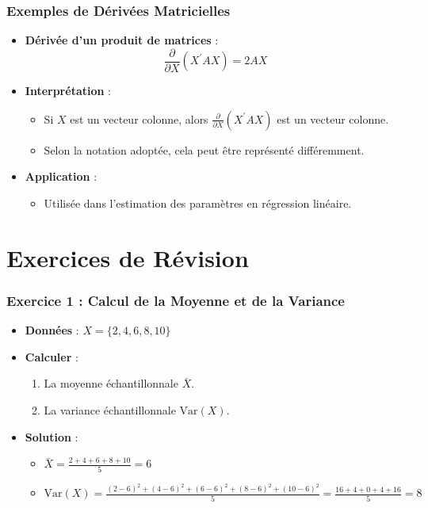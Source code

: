\documentclass{beamer}
\begin{document}
\begin{frame}
  \frametitle{Exemples de Dérivées Matricielles}
  \begin{itemize}
    \item \textbf{Dérivée d’un produit de matrices} : 
    \[
    \frac{\partial}{\partial X} (X^{\prime} A X) = 2 A X
    \]
    \item \textbf{Interprétation} :
      \begin{itemize}
        \item Si \(X\) est un vecteur colonne, alors \(\frac{\partial}{\partial X} (X^{\prime} A X)\) est un vecteur colonne.
        \item Selon la notation adoptée, cela peut être représenté différemment.
      \end{itemize}
    \item \textbf{Application} : 
      \begin{itemize}
        \item Utilisée dans l'estimation des paramètres en régression linéaire.
      \end{itemize}
  \end{itemize}
\end{frame}

\section{Exercices de Révision}

\begin{frame}
  \frametitle{Exercice 1 : Calcul de la Moyenne et de la Variance}
  \begin{itemize}
    \item \textbf{Données} : \( X = \{2, 4, 6, 8, 10\} \)
    \item \textbf{Calculer} :
      \begin{enumerate}
        \item La moyenne échantillonnale \(\bar{X}\).
        \item La variance échantillonnale \(\text{Var}(X)\).
      \end{enumerate}
    \item \textbf{Solution} : 
      \begin{itemize}
        \item \(\bar{X} = \frac{2 + 4 + 6 + 8 + 10}{5} = 6\)
        \item \(\text{Var}(X) = \frac{(2-6)^2 + (4-6)^2 + (6-6)^2 + (8-6)^2 + (10-6)^2}{5} = \frac{16 + 4 + 0 + 4 + 16}{5} = 8\)
      \end{itemize}
  \end{itemize}
\end{frame}
\end{document}
